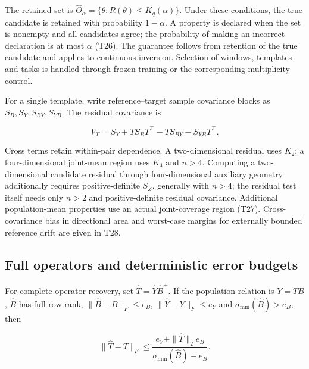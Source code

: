 \documentclass[11pt,a4paper]{article}
\begin{document}
The retained set is
\(\widehat\Theta_\alpha=\{\theta:R(\theta)\leq K_q(\alpha)\}\). Under
these conditions, the true candidate is retained with probability
\(1-\alpha\). A property is declared when the set is nonempty and all
candidates agree; the probability of making an incorrect declaration is
at most \(\alpha\) (T26). The guarantee follows from retention of the
true candidate and applies to continuous inversion. Selection of
windows, templates and tasks is handled through frozen training or the
corresponding multiplicity control.

\par
\noindent\begin{minipage}{\linewidth}

For a single template, write reference–target sample covariance blocks
as \(S_B,S_Y,S_{BY},S_{YB}\). The residual covariance is

\[
V_T=S_Y+TS_BT^\top-TS_{BY}-S_{YB}T^\top.
\]

\end{minipage}\par

Cross terms retain within-pair dependence. A two-dimensional residual
uses \(K_2\); a four-dimensional joint-mean region uses \(K_4\) and
\(n>4\). Computing a two-dimensional candidate residual through
four-dimensional auxiliary geometry additionally requires
positive-definite \(S_Z\), generally with \(n>4\); the residual test
itself needs only \(n>2\) and positive-definite residual covariance.
Additional population-mean properties use an actual joint-coverage
region (T27). Cross-covariance bias in directional area and worst-case
margins for externally bounded reference drift are given in T28.

\subsection{Full operators and deterministic error
budgets}\label{full-operators-and-deterministic-error-budgets}

\par
\noindent\begin{minipage}{\linewidth}

For complete-operator recovery, set
\(\widehat T=\widehat Y\widehat B^+\). If the population relation is
\(Y=TB\), \(\widehat B\) has full row rank,
\(\|\widehat B-B\|_F\leq e_B\), \(\|\widehat Y-Y\|_F\leq e_Y\) and
\(\sigma_{\min}(\widehat B)>e_B\), then

\[
\|\widehat T-T\|_F\leq
\frac{e_Y+\|\widehat T\|_2e_B}
{\sigma_{\min}(\widehat B)-e_B}.
\]

\end{minipage}\par
\end{document}
